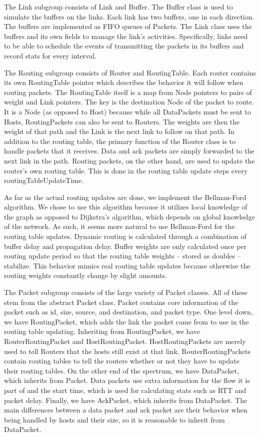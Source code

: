     The Link subgroup consists of Link and Buffer. The Buffer class is used to simulate the buffers on the links. Each link has two buffers, one in each direction. The buffers are implemented as FIFO queues of Packets. The Link class uses the buffers and its own fields to manage the link’s activities. Specifically, links need to be able to schedule the events of transmitting the packets in its buffers and record stats for every interval.

    The Routing subgroup consists of Router and RoutingTable. Each router contains its own RoutingTable pointer which describes the behavior it will follow when routing packets. The RoutingTable itself is a map from Node pointers to pairs of weight and Link pointers. The key is the destination Node of the packet to route. It is a Node (as opposed to Host) because while all DataPackets must be sent to Hosts, RoutingPackets can also be sent to Routers. The weights are then the weight of that path and the Link is the next link to follow on that path. In addition to the routing table, the primary function of the Router class is to handle packets that it receives. Data and ack packets are simply forwarded to the next link in the path. Routing packets, on the other hand, are used to update the router’s own routing table. This is done in the routing table update steps every routingTableUpdateTime. 

As far as the actual routing updates are done, we implement the Bellman-Ford algorithm. We chose to use this algorithm because it utilizes local knowledge of the graph as opposed to Dijkstra’s algorithm, which depends on global knowledge of the network. As such, it seems more natural to use Bellman-Ford for the routing table updates. Dynamic routing is calculated through a combination of buffer delay and propagation delay. Buffer weights are only calculated once per routing update period so that the routing table weights -- stored as doubles -- stabilize. This behavior mimics real routing table updates because otherwise the routing weights constantly change by slight amounts.

    The Packet subgroup consists of the large variety of Packet classes. All of these stem from the abstract Packet class. Packet contains core information of the packet such as id, size, source, and destination, and packet type. One level down, we have RoutingPacket, which adds the link the packet came from to use in the routing table updating. Inheriting from RoutingPacket, we have RouterRoutingPacket and HostRoutingPacket. HostRoutingPackets are merely used to tell Routers that the hosts still exist at that link. RouterRoutingPackets contain routing tables to tell the routers whether or not they have to update their routing tables. On the other end of the spectrum, we have DataPacket, which inherits from Packet. Data packets use extra information for the flow it is part of and the start time, which is used for calculating stats such as RTT and packet delay. Finally, we have AckPacket, which inherits from DataPacket. The main differences between a data packet and ack packet are their behavior when being handled by hosts and their size, so it is reasonable to inherit from DataPacket.

